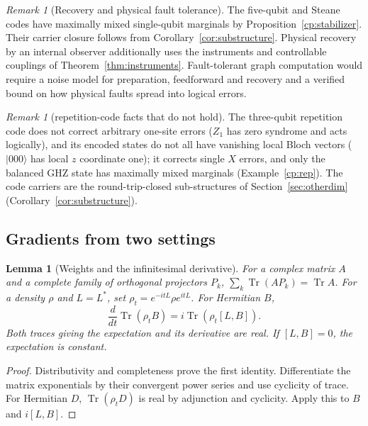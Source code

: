 \documentclass[aps,pra,onecolumn,superscriptaddress,nofootinbib,10pt]{revtex4-2}
\newtheorem{lemma}[theorem]{Lemma}
\theoremstyle{definition}
\theoremstyle{remark}
\newtheorem{remark}[theorem]{Remark}
\begin{document}
\begin{remark}[Recovery and physical fault tolerance]\label{cp:recoveryprogramme}
The five-qubit and Steane codes have maximally mixed single-qubit marginals by Proposition~\ref{cp:stabilizer}. Their carrier closure follows from Corollary~\ref{cor:substructure}. Physical recovery by an internal observer additionally uses the instruments and controllable couplings of Theorem~\ref{thm:instruments}. Fault-tolerant graph computation would require a noise model for preparation, feedforward and recovery and a verified bound on how physical faults spread into logical errors.
\end{remark}

\begin{remark}[repetition-code facts that do not hold]\label{rem:cprep}
The three-qubit repetition code does not correct arbitrary one-site errors ($Z_1$ has zero syndrome and acts
logically), and its encoded states do not all have vanishing local Bloch vectors ($\lvert000\rangle$ has local $z$ coordinate
one); it corrects single $X$ errors, and only the balanced GHZ state has maximally mixed marginals
(Example~\ref{cp:rep}).  The code carriers are the round-trip-closed sub-structures of
Section~\ref{sec:otherdim} (Corollary~\ref{cor:substructure}).
\end{remark}

\subsection{Gradients from two settings}

\begin{lemma}[Weights and the infinitesimal derivative]\label{cp:infinitesimal}
For a complex matrix $A$ and a complete family of orthogonal projectors $P_k$,
$\sum_k\operatorname{Tr}(A P_k)=\operatorname{Tr}A$. For a density $\rho$ and $L=L^*$, set $\rho_t=e^{-itL}\rho e^{itL}$. For Hermitian $B$,
\[
 \frac{d}{dt}\operatorname{Tr}(\rho_t B)=i\operatorname{Tr}(\rho_t[L,B]).
\]
Both traces giving the expectation and its derivative are real. If $[L,B]=0$, the expectation is constant.
\end{lemma}
\begin{proof}
Distributivity and completeness prove the first identity. Differentiate the matrix exponentials by their convergent power series and use cyclicity of trace. For Hermitian $D$, $\operatorname{Tr}(\rho_t D)$ is real by adjunction and cyclicity. Apply this to $B$ and $i[L,B]$.
\end{proof}
\end{document}
